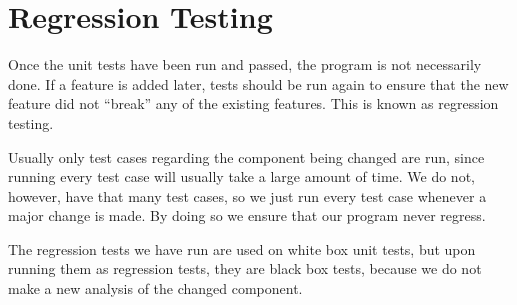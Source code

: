 \section{Regression Testing}
Once the unit tests have been run and passed, the program is not necessarily done.
If a feature is added later, tests should be run again to ensure that the new feature did not ``break'' any of the existing features.
This is known as regression testing.

Usually only test cases regarding the component being changed are run, since running every test case will usually take a large amount of time.
We do not, however, have that many test cases, so we just run every test case whenever a major change is made.
By doing so we ensure that our program never regress.

The regression tests we have run are used on white box unit tests, but upon running them as regression tests, they are black box tests, because we do not make a new analysis of the changed component.